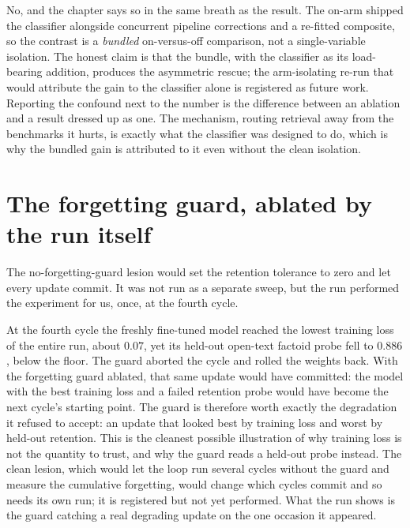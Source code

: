 \begin{defence}
No, and the chapter says so in the same breath as the result. The on-arm shipped the
classifier alongside concurrent pipeline corrections and a re-fitted composite, so the
contrast is a \emph{bundled} on-versus-off comparison, not a single-variable isolation.
The honest claim is that the bundle, with the classifier as its load-bearing addition,
produces the asymmetric rescue; the arm-isolating re-run that would attribute the gain
to the classifier alone is registered as future work. Reporting the confound next to the
number is the difference between an ablation and a result dressed up as one. The
mechanism, routing retrieval away from the benchmarks it hurts, is exactly what the
classifier was designed to do, which is why the bundled gain is attributed to it even
without the clean isolation.
\end{defence}

\section{The forgetting guard, ablated by the run itself}
\label{sec:abl-guard}

The no-forgetting-guard lesion would set the retention tolerance to zero and let every
update commit. It was not run as a separate sweep, but the run performed the experiment
for us, once, at the fourth cycle.

\begin{precise}
At the fourth cycle the freshly fine-tuned model reached the lowest training loss of the
entire run, about $0.07$, yet its held-out open-text factoid probe fell to $0.886$,
below the floor. The guard aborted the cycle and rolled the weights back. With the
forgetting guard ablated, that same update would have committed: the model with the
best training loss and a failed retention probe would have become the next cycle's
starting point. The guard is therefore worth exactly the degradation it refused to
accept: an update that looked best by training loss and worst by held-out retention.
This is the cleanest possible illustration of why training loss is not the quantity to
trust, and why the guard reads a held-out probe instead. The clean lesion, which would
let the loop run several cycles without the guard and measure the cumulative
forgetting, would change which cycles commit and so needs its own run; it is registered
but not yet performed. What the run shows is the guard catching a real degrading update
on the one occasion it appeared.
\end{precise}


